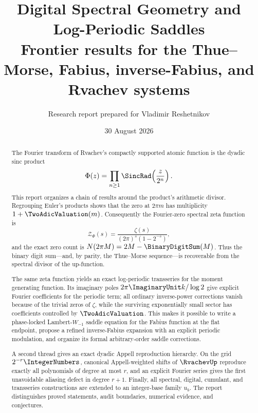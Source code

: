 \documentclass[11pt,oneside]{article}
\title{\bfseries Digital Spectral Geometry and Log-Periodic Saddles\\[0.35em]
\large Frontier results for the Thue--Morse, Fabius, inverse-Fabius,
and Rvachev systems}
\author{Research report prepared for Vladimir Reshetnikov}
\date{30 August 2026}
\theoremstyle{definition}
\theoremstyle{remark}
\begin{document}
\maketitle

\begin{abstract}
The Fourier transform of Rvachev's compactly supported atomic function is the
dyadic sinc product
\[
 \Phi(z)=\prod_{n\geq1}\SincRad\!\left(\frac{z}{2^n}\right).
\]
This report organizes a chain of results around the product's arithmetic
divisor.  Regrouping Euler's products shows that the
zero at \(2\pi m\) has multiplicity \(1+\TwoAdicValuation(m)\).  Consequently the
Fourier-zero spectral zeta function is
\[
 \mathcal Z_\Phi(s)
 =\frac{\zeta(s)}{(2\pi)^s(1-2^{-s})},
\]
and the exact zero count is \(N(2\pi M)=2M-\BinaryDigitSum(M)\).  Thus the binary digit
sum---and, by parity, the Thue--Morse sequence---is recoverable from the
spectral divisor of the up-function.

The same zeta function yields an exact log-periodic transseries for the moment
generating function.  Its imaginary poles
\(2\pi\ImaginaryUnit k/\log2\) give explicit Fourier coefficients for the periodic term;
all ordinary inverse-power corrections vanish because of the trivial zeros of
\(\zeta\), while the surviving exponentially small sector has coefficients
controlled by \(\TwoAdicValuation\).  This makes it possible to write a phase-locked
Lambert-\(W_{-1}\) saddle equation for the Fabius function at the flat endpoint,
propose a refined inverse-Fabius expansion with an explicit periodic
modulation, and organize its formal arbitrary-order saddle corrections.

A second thread gives an exact dyadic Appell reproduction hierarchy.  On the grid
\(2^{-r}\IntegerNumbers\), canonical Appell-weighted shifts of \(\RvachevUp\) reproduce exactly
all polynomials of degree at most \(r\), and an explicit Fourier series gives
the first unavoidable aliasing defect in degree \(r+1\).  Finally, all spectral,
digital, cumulant, and transseries constructions are extended to an
integer-base family \(u_b\).  The report distinguishes proved statements,
audit boundaries, numerical evidence, and conjectures.
\end{abstract}
\end{document}
